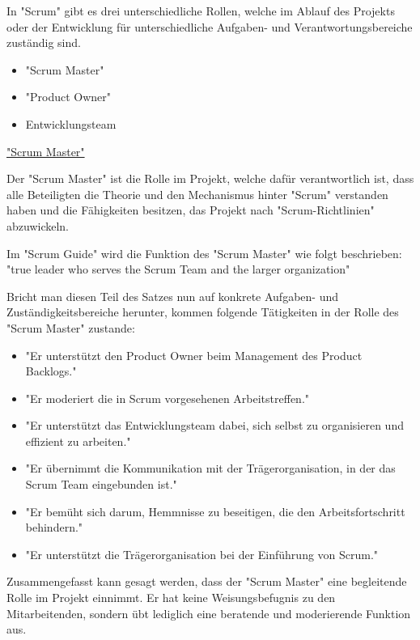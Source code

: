 
In "Scrum" gibt es drei unterschiedliche Rollen, welche im Ablauf des Projekts oder der Entwicklung für unterschiedliche Aufgaben- und Verantwortungsbereiche zuständig sind.

\begin{itemize}
    \item "Scrum Master"
    \item "Product Owner"
    \item Entwicklungsteam
\end{itemize}

\cite{Scrum}

\underline{"Scrum Master"}

Der "Scrum Master" ist die Rolle im Projekt, welche dafür verantwortlich ist, dass alle Beteiligten die Theorie und den Mechanismus hinter "Scrum" verstanden haben und die Fähigkeiten besitzen, das Projekt nach "Scrum-Richtlinien" abzuwickeln. \cite{ScrumMaster}

Im "Scrum Guide" wird die Funktion des "Scrum Master" wie folgt beschrieben: "true leader who serves the Scrum Team and the larger organization" \cite{ScrumMaster}

Bricht man diesen Teil des Satzes nun auf konkrete Aufgaben- und Zuständigkeitsbereiche herunter, kommen folgende Tätigkeiten in der Rolle des "Scrum Master" zustande:

\begin{itemize}
    \item "Er unterstützt den Product Owner beim Management des Product Backlogs." \cite{ScrumMaster}
    \item "Er moderiert die in Scrum vorgesehenen Arbeitstreffen." \cite{ScrumMaster}
    \item "Er unterstützt das Entwicklungsteam dabei, sich selbst zu organisieren und effizient zu arbeiten." \cite{ScrumMaster}
    \item "Er übernimmt die Kommunikation mit der Trägerorganisation, in der das Scrum Team eingebunden ist." \cite{ScrumMaster}
    \item "Er bemüht sich darum, Hemmnisse zu beseitigen, die den Arbeitsfortschritt behindern." \cite{ScrumMaster}
    \item "Er unterstützt die Trägerorganisation bei der Einführung von Scrum." \cite{ScrumMaster}
\end{itemize}

Zusammengefasst kann gesagt werden, dass der "Scrum Master" eine begleitende Rolle im Projekt einnimmt. Er hat keine Weisungsbefugnis zu den Mitarbeitenden, sondern übt lediglich eine beratende und moderierende Funktion aus. \cite{ScrumMaster}

